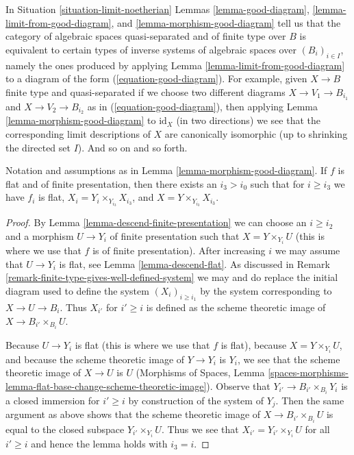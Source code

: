 \begin{remark}
\label{remark-finite-type-gives-well-defined-system}
In Situation \ref{situation-limit-noetherian}
Lemmas \ref{lemma-good-diagram}, \ref{lemma-limit-from-good-diagram}, and
\ref{lemma-morphism-good-diagram}
tell us that the category of algebraic spaces quasi-separated and
of finite type over $B$ is equivalent to certain types of
inverse systems of algebraic spaces over $(B_i)_{i \in I}$, namely
the ones produced by applying Lemma \ref{lemma-limit-from-good-diagram}
to a diagram of the form (\ref{equation-good-diagram}).
For example, given $X \to B$ finite type and quasi-separated
if we choose two different diagrams $X \to V_1 \to B_{i_1}$
and $X \to V_2 \to B_{i_2}$ as in (\ref{equation-good-diagram}), then
applying Lemma \ref{lemma-morphism-good-diagram} to $\text{id}_X$
(in two directions)
we see that the corresponding limit descriptions of
$X$ are canonically isomorphic (up to shrinking the
directed set $I$). And so on and so forth.
\end{remark}

\begin{lemma}
\label{lemma-morphism-good-diagram-flat}
Notation and assumptions as in Lemma \ref{lemma-morphism-good-diagram}.
If $f$ is flat and of finite presentation, then
there exists an $i_3 > i_0$ such that for $i \geq i_3$ we have
$f_i$ is flat, $X_i = Y_i \times_{Y_{i_3}} X_{i_3}$, and
$X = Y \times_{Y_{i_3}} X_{i_3}$.
\end{lemma}

\begin{proof}
By Lemma \ref{lemma-descend-finite-presentation}
we can choose an $i \geq i_2$ and a morphism
$U \to Y_i$ of finite presentation such that $X = Y \times_{Y_i} U$
(this is where we use that $f$ is of finite presentation).
After increasing $i$ we may assume that $U \to Y_i$ is flat, see
Lemma \ref{lemma-descend-flat}.
As discussed in Remark \ref{remark-finite-type-gives-well-defined-system}
we may and do replace the initial diagram used to define the system
$(X_i)_{i \geq i_1}$ by the system corresponding to
$X \to U \to B_i$. Thus $X_{i'}$ for $i' \geq i$ is defined as
the scheme theoretic image of $X \to B_{i'} \times_{B_i} U$.

\medskip\noindent
Because $U \to Y_i$ is flat (this is where we use that $f$ is flat),
because $X = Y \times_{Y_i} U$, and
because the scheme theoretic image of $Y \to Y_i$ is $Y_i$,
we see that the scheme theoretic image of $X \to U$ is $U$
(Morphisms of Spaces, Lemma
\ref{spaces-morphisms-lemma-flat-base-change-scheme-theoretic-image}).
Observe that $Y_{i'} \to B_{i'} \times_{B_i} Y_i$ is a closed
immersion for $i' \geq i$ by construction of the system of $Y_j$.
Then the same argument as above shows that the scheme theoretic image
of $X \to B_{i'} \times_{B_i} U$
is equal to the closed subspace $Y_{i'} \times_{Y_i} U$.
Thus we see that $X_{i'} = Y_{i'} \times_{Y_i} U$ for all $i' \geq i$
and hence the lemma holds with $i_3 = i$.
\end{proof}

